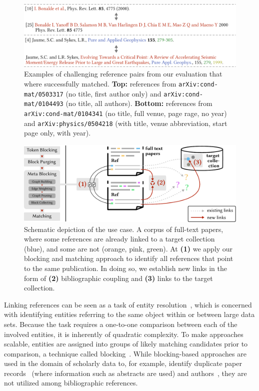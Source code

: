 \begin{figure}[tb]
  \centering
  \includegraphics[width=\linewidth]{figures/ref_covgran/hardmatch_examples.pdf}
  \caption[Examples of challenging reference pairs from our evaluation that where successfully matched]{Examples of challenging reference pairs from our evaluation that where successfully matched. \textbf{Top:} references from \texttt{arXiv:cond-mat/0503317} (no title, first author only) and \texttt{arXiv:cond-mat/0104493} (no title, all authors). \textbf{Bottom:} references from \texttt{arXiv:cond-mat/0104341} (no title, full venue, page rage, no year) and \texttt{arXiv:physics/0504218} (with title, venue abbreviation, start page only, with year).}
  \label{fig:hardmatch}
\end{figure}

\begin{figure}[tb]
  \centering
  \includegraphics[width=\linewidth]{figures/ref_covgran/approach_withblocking_10pvar.pdf}
  \caption[Schematic depiction of the use case]{Schematic depiction of the use case. A corpus of full-text papers, where some references are already linked to a target collection (blue), and some are not (orange, pink, green). At \textbf{(1)} we apply our blocking and matching approach to identify all references that point to the same publication. In doing so, we establish new links in the form of \textbf{(2)} bibliographic coupling and \textbf{(3)} links to the target collection.}
  \label{fig:approach}
\end{figure}

Linking references can be seen as a task of entity resolution~\cite{Christophides2015ERdef}, which is concerned with identifying entities referring to the same object within or between large data sets. Because the task requires a one-to-one comparison between each of the involved entities, it is inherently of quadratic complexity. To make approaches scalable, entities are assigned into groups of likely matching candidates prior to comparison, a technique called blocking~\cite{Papadakis2020survey}.
While blocking-based approaches are used in the domain of scholarly data to, for example, identify duplicate paper records~\cite{Simonini2016blast,Sefid2019,Lo2020} (where information such as abstracts are used) and authors~\cite{FaerberLin2022}, they are not utilized among bibliographic references.


